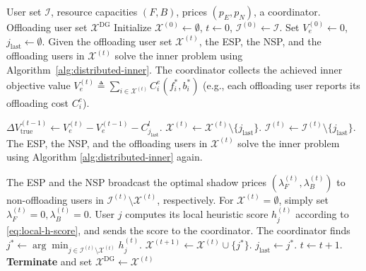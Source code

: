 \documentclass[lettersize,journal]{IEEEtran}
\begin{document}
\begin{algorithm}[t]
  \caption{Heuristic Distributed Algorithm for Offloading User Selection}
  \label{alg:distributed-greedy-SCM}
  \begin{algorithmic}[1]
    \REQUIRE User set $\mathcal{I}$, resource capacities $(F,B)$, prices $(p_E,p_N)$, a coordinator.
    \ENSURE Offloading user set $\mathcal{X}^{\mathrm{DG}}$
    \STATE Initialize $\mathcal{X}^{(0)} \gets \emptyset$, $t \gets 0$, $\mathcal{I}^{(0)}\gets\mathcal{I}$.
    \STATE Set $V_e^{(0)} \leftarrow 0$, $j_{\text{last}} \leftarrow \emptyset$.
    \REPEAT
      \STATE Given the offloading user set $\mathcal{X}^{(t)}$, the ESP, the NSP, and the offloading users in $\mathcal{X}^{(t)}$ solve the inner problem using Algorithm~\ref{alg:distributed-inner}.
      \STATE The coordinator collects the achieved inner objective value
      $V_e^{(t)} \triangleq \sum_{i\in \mathcal{X}^{(t)}} C_i^e(f_i^*, b_i^*)$
      (e.g., each offloading user reports its offloading cost $C_i^e$).

        \STATE $\Delta V_{\text{true}}^{(t-1)} \leftarrow V_e^{(t)} - V_e^{(t-1)} - C^l_{j_{\text{last}}}$.
          \STATE $\mathcal{X}^{(t)} \gets \mathcal{X}^{(t)} \setminus \{j_{\text{last}}\}$. 
          \STATE $\mathcal{I}^{(t)} \gets \mathcal{I}^{(t)} \setminus \{j_{\text{last}}\}$. 
          \STATE The ESP, the NSP, and the offloading users in $\mathcal{X}^{(t)}$ solve the inner problem using Algorithm \ref{alg:distributed-inner} again.
        \ENDIF
      \ENDIF

      \STATE The ESP and the NSP broadcast the optimal shadow prices $(\lambda_F^{(t)},\lambda_B^{(t)})$
      to non-offloading users in $\mathcal{I}^{(t)}\setminus\mathcal{X}^{(t)}$, respectively.
      For $\mathcal{X}^{(t)}=\emptyset$, simply set $\lambda_F^{(t)}=0,\lambda_B^{(t)}=0$.
        \STATE User $j$ computes its local heuristic score $h_j^{(t)}$ according to \eqref{eq:local-h-score}, and sends the score to the coordinator.
      \ENDFOR
      \STATE The coordinator finds $j^* \gets \arg\min_{j\in \mathcal{I}^{(t)}\setminus \mathcal{X}^{(t)}} h_j^{(t)}$.
        \STATE $\mathcal{X}^{(t+1)} \gets \mathcal{X}^{(t)} \cup \{j^*\}$.
        \STATE $j_{\text{last}} \gets j^*$.
        \STATE $t \gets t+1$.
      \ELSE
        \STATE \textbf{Terminate} and set $\mathcal{X}^{\mathrm{DG}} \gets \mathcal{X}^{(t)}$
      \ENDIF
  \end{algorithmic}
\end{algorithm}
\end{document}
